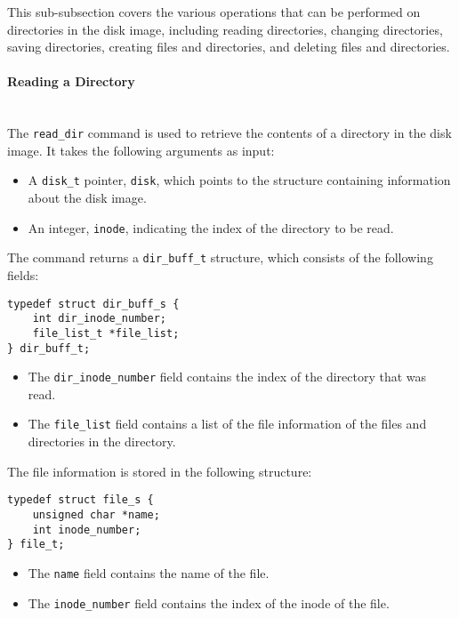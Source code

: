 \documentclass{article}
\begin{document}
This sub-subsection covers the various operations that can be performed on directories in the disk image, including reading directories, changing directories, saving directories, creating files and directories, and deleting files and directories.

\paragraph{Reading a Directory}\mbox{}\\
The \texttt{read\_dir} command is used to retrieve the contents of a directory in the disk image. It takes the following arguments as input:

\begin{itemize}
    \item A \texttt{disk\_t} pointer, \texttt{disk}, which points to the structure containing information about the disk image.
    \item An integer, \texttt{inode}, indicating the index of the directory to be read.
\end{itemize}

The command returns a \texttt{dir\_buff\_t} structure, which consists of the following fields:

\begin{lstlisting}[style=cstyle]
typedef struct dir_buff_s {
    int dir_inode_number;
    file_list_t *file_list;
} dir_buff_t;
\end{lstlisting}

\begin{itemize}
    \item The \texttt{dir\_inode\_number} field contains the index of the directory that was read.
    \item The \texttt{file\_list} field contains a list of the file information of the files and directories in the directory.
\end{itemize}

The file information is stored in the following structure:

\begin{lstlisting}[style=cstyle]
typedef struct file_s {
    unsigned char *name;
    int inode_number;
} file_t;
\end{lstlisting}

\begin{itemize}
    \item The \texttt{name} field contains the name of the file.
    \item The \texttt{inode\_number} field contains the index of the inode of the file.
\end{itemize}
\end{document}
